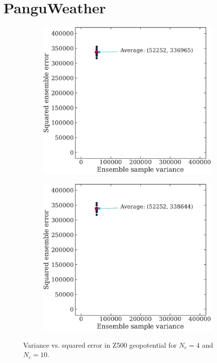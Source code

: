 \documentclass[parskip=half,DIV=12,bookmarkpackage=false]{scrartcl}
\begin{document}
 \section{PanguWeather}

 \begin{figure}[ht]
    \centering
    
    \begin{subfigure}[c]{0.49\textwidth}
        \includegraphics[width=\textwidth]{figures/var_vs_err_pangu_ens.pdf}
        \label{fig:pangu-ens}
    \end{subfigure}
    \hfill
    \begin{subfigure}[c]{0.49\textwidth}
        \includegraphics[width=\textwidth]{figures/var_vs_err_pangu_era5.pdf}
        \label{fig:pangu-era}
    \end{subfigure}
    
    \caption{Variance vs. squared error in Z500 geopotential for $N_e = 4$ and $N_c = 10$.}
    \label{fig:pangu}
 \end{figure}
\end{document}
